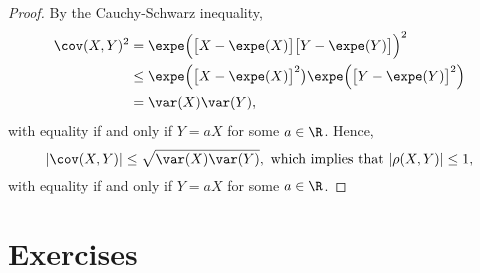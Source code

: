 \begin{proof}
By the Cauchy-Schwarz inequality,
\begin{align*}
\cov(X,Y)^2
	& = \expe\Big(\big[X-\expe(X)\big]\big[Y-\expe(Y)\big]\Big)^2 \\
	& \leq \expe\Big(\big[X-\expe(X)\big]^2\big)\expe\Big(\big[Y-\expe(Y)\big]^2\Big) \\
	& = \var(X)\var(Y),
\end{align*}
with equality if and only if $Y=aX$ for some $a\in\R$. Hence,
\[
|\cov(X,Y)| \leq \sqrt{\var(X)\var(Y)},
\text{ which implies that }
|\rho(X,Y)|	\leq 1,
\]
with equality if and only if $Y=aX$ for some $a\in\R$. 
\end{proof}


\section{Exercises}


\endinput
